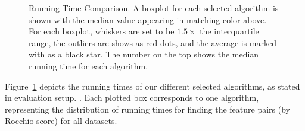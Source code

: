 \begin{figure}[h]
\centering %
\vspace{-5mm}
\vspace{-5mm}
\caption{Running Time Comparison. A boxplot for each selected algorithm is shown with the median value appearing in matching color above. For each boxplot, whiskers are set to be $1.5\times$ the interquartile range, the outliers are shows as red dots, and the average is marked with as a black star. The number on the top shows the median running time for each algorithm.}
\vspace{-5mm}
\label{fig:time}
\end{figure}

 Figure~\ref{fig:time} depicts the running times of our different selected algorithms, as stated in evaluation setup. . Each plotted box corresponds to one algorithm, representing the distribution of running times for finding the \topk feature pairs (by Rocchio score) for all datasets. 

